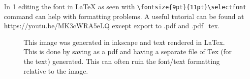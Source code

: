 
In \cref{fig:label} editing the font in LaTeX as seen with \verb|\fontsize{9pt}{11pt}\selectfont| command can help with formatting problems.
A useful tutorial can be found at \href{https://youtu.be/MK3cWRA5eLQ}{\url{https://youtu.be/MK3cWRA5eLQ}} except export to .pdf and .pdf\_tex.
\begin{figure}[tbp]
	\centering
	{
	\fontsize{12pt}{14pt}\selectfont
	\def\svgwidth{0.5\linewidth}
	
	}
	\caption[short caption]{\label{fig:label}
		This image was generated in inkscape and text rendered in LaTex.
		This is done by saving as a pdf and having a separate file of Tex (for the text) generated.
		This can often ruin the font/text formatting relative to the image.
	}
\end{figure}
